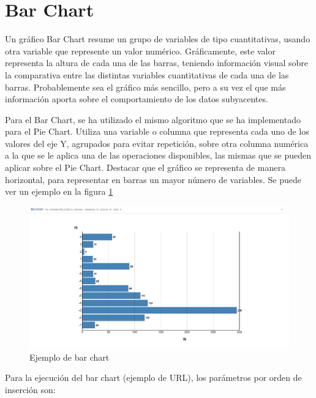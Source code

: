 
\section{Bar Chart}
Un gráfico Bar Chart resume un grupo de variables de tipo cuantitativas, usando otra variable que represente un valor numérico. Gráficamente, este valor representa la altura de cada una de las barras, teniendo información visual sobre la comparativa entre las distintas variables cuantitativas de cada una de las barras. Probablemente sea el gráfico más sencillo, pero a su vez el que más información aporta sobre el comportamiento de los datos subyacentes. 

Para el Bar Chart, se ha utilizado el mismo algoritmo que se ha implementado para el Pie Chart. Utiliza una variable o columna que representa cada uno de los valores del eje Y, agrupados para evitar repetición, sobre otra columna numérica a la que se le aplica una de las operaciones disponibles, las mismas que se pueden aplicar sobre el Pie Chart. Destacar que el gráfico se representa de manera horizontal, para representar en barras un mayor número de variables. Se puede ver un ejemplo en la figura \ref{fig:ejemplobarchart}
\begin{figure}
	\centering
	\includegraphics[width=1\linewidth]{imagenes/ejemplo_barchart}
	\caption{Ejemplo de bar chart}
	\label{fig:ejemplobarchart}
\end{figure}

Para la ejecución del bar chart (ejemplo de URL\footnotemark), los parámetros por orden de inserción son:

